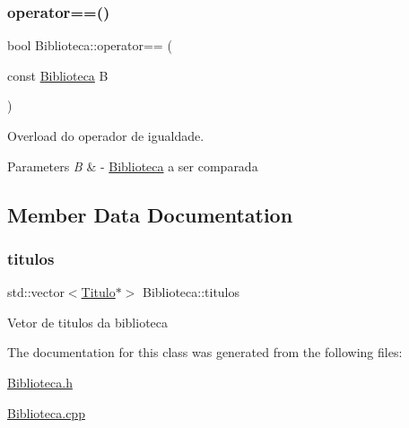 \subsubsection{\texorpdfstring{operator==()}{operator==()}}
{\footnotesize\ttfamily bool Biblioteca\+::operator== (\begin{DoxyParamCaption}\item[{const \mbox{\hyperlink{class_biblioteca}{Biblioteca}}}]{B }\end{DoxyParamCaption})}



Overload do operador de igualdade. 


\begin{DoxyParams}{Parameters}
{\em B} & -\/ \mbox{\hyperlink{class_biblioteca}{Biblioteca}} a ser comparada \\
\hline
\end{DoxyParams}


\subsection{Member Data Documentation}
\mbox{\label{class_biblioteca_a6aed0a1d07752adc3e74939b2128ed5e}} 
\subsubsection{\texorpdfstring{titulos}{titulos}}
{\footnotesize\ttfamily std\+::vector$<$\mbox{\hyperlink{class_titulo}{Titulo}}$\ast$$>$ Biblioteca\+::titulos\hspace{0.3cm}{\ttfamily [private]}}

Vetor de titulos da biblioteca 

The documentation for this class was generated from the following files\+:\begin{DoxyCompactItemize}
\item 
\mbox{\hyperlink{_biblioteca_8h}{Biblioteca.\+h}}\item 
\mbox{\hyperlink{_biblioteca_8cpp}{Biblioteca.\+cpp}}\end{DoxyCompactItemize}
